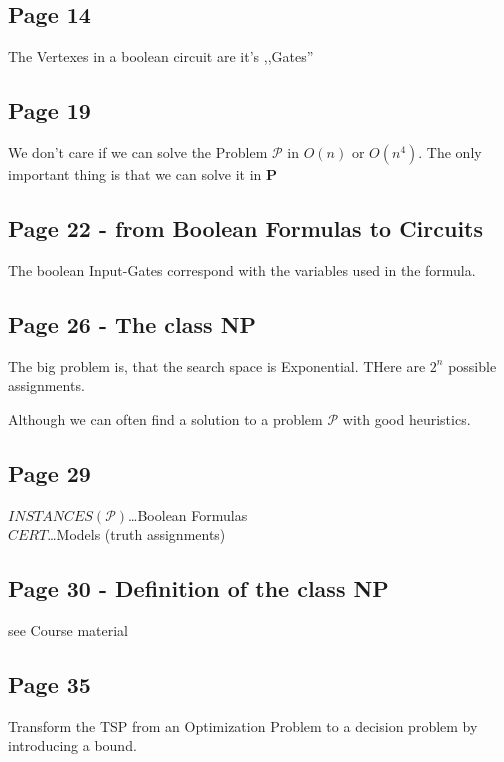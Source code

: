 \documentclass[a4paper]{article}
\begin{document}
\subsection{Page 14}
The Vertexes in a boolean circuit are it's ,,Gates''\\

\subsection{Page 19}
We don't care if we can solve the Problem $\mathcal{P}$ in $O(n)$ or $O(n^4)$.
The only important thing is that we can solve it in \textbf{P}

\subsection{Page 22  - from Boolean Formulas to Circuits}
The boolean Input-Gates correspond with the variables used in the formula.

\subsection{Page 26 - The class NP}
The big problem is, that the search space is Exponential.
THere are $2^n$ possible assignments.

Although we can often find a solution to a problem $\mathcal{P}$ with good
heuristics.

\subsection{Page 29}
$INSTANCES(\mathcal{P})$\ldots Boolean Formulas\\
$CERT$\ldots Models (truth assignments)

\subsection{Page 30 - Definition of the class NP}
see Course material

\subsection{Page 35}
Transform the TSP from an Optimization Problem to a decision problem by
introducing a bound.
\end{document}
